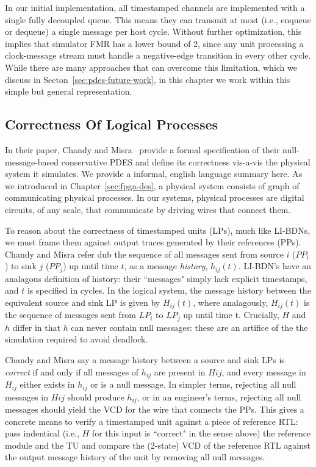 In our initial implementation, all timestamped channels are implemented with a single fully decoupled queue.
This means they can transmit at most (i.e., enqueue
or dequeue) a single message per host cycle. Without further optimization, this
implies that simulator FMR has a lower bound of 2, since any unit processing a
clock-message stream must handle a negative-edge transition in every other
cycle. While there are many approaches that can overcome this limitation, which
we discuss in Secton~\ref{sec:pdes-future-work}, in this chapter we work within
this simple but general representation.

\subsection{Correctness Of Logical Processes}\label{sec:lp-correctness}

In their paper, Chandy and Misra~\cite{NullMessagesChandy} provide a formal
specification of their null-message-based conservative PDES and define its correctness vis-a-vis the
physical system it simulates. We provide a informal, english language summary
here.  As we introduced in Chapter~\ref{sec:fpga-des}, a physical system
consists of graph of communicating physical processes. In our systems,
physical processes are digital circuits, of any scale, that communicate by
driving wires that connect them.

To reason about the correctness of timestamped units (LPs), much like LI-BDNs,
we must frame them against output traces generated by their references (PPs).
Chandy and Misra refer dub the sequence of all messages sent from source
$i$ ($PP_{i}$) to sink $j$ ($PP_{j}$) up until time $t$, as a message \emph{history},
$h_{ij}(t)$.  LI-BDN's have an analagous definition of history: their
``messages" simply lack explicit timestamps, and $t$ is specified in cycles.
In the logical system, the message history between the equivalent source and
sink LP is given by $H_{ij}(t)$, where analagously,  $H_{ij}(t)$ is the
sequence of messages sent from $LP_{i}$ to $LP_{j}$ up until time t. Crucially,
$H$ and $h$ differ in that $h$ can never contain null messages: these are an
artifice of the the simulation required to avoid deadlock.

Chandy and Misra say a message history between a source and sink LPs is
\emph{correct} if and only if all messages of $h_{ij}$ are present in $Hij$,
and every message in $H_{ij}$ either exists in $h_{ij}$ or is a null message.
In simpler terms, rejecting all null messages in $Hij$ should produce $h_{ij}$,
or in an engineer's terms, rejecting all null messages should yield the VCD for
the wire that connects the PPs. This gives a concrete means to verify a
timestamped unit against a piece of reference RTL: pass indentical (i.e., $H$
for this input is ``correct" in the sense above) the reference module and the
TU and compare the (2-state) VCD of the reference RTL against the output
message history of the unit by removing all null messages.

